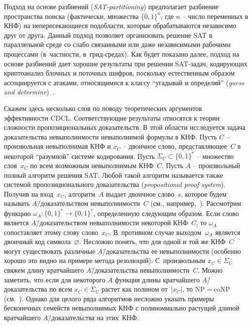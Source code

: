Подход на основе разбиений (\textit{SAT-partitioning}) предполагает разбиение пространства поиска (фактически, множества $\{ 0,1 \}^{n}$, где $n$ \--- число переменных в КНФ) на непересекающиеся подобласти, которые обрабатываются независимо друг от друга.
Данный подход позволяет организовать решение SAT в параллельной среде со слабо связанными или даже независимыми рабочими процессами (в~частности, в~грид-средах).
Как будет показано далее, подход на основе разбиений дает хорошие результаты при решении SAT-задач, кодирующих криптоанализ блочных и поточных шифров, поскольку естественным образом ассоциируется с атаками, относящимися к классу \enquote{угадывай и определяй} (\textit{guess and determine})~\cite{bard2009}.

Скажем здесь несколько слов по поводу теоретических аргументов эффективности CDCL.
Соответствующие результаты относятся к теории сложности пропозициональных доказательств.
В этой области исследуется задача доказательства невыполнимости невыполнимой формулы в КНФ.
Пусть $C$ \--- произвольная невыполнимая КНФ и $x_{C}$ \--- двоичное слово, представляющее~$C$ в некоторой \enquote{разумной} системе кодирования.
Пусть $\Sigma_{U} \subset \{ 0,1 \}^{*}$ \--- множество слов~$x_{C}$ по всем возможным невыполнимым КНФ~$C$.
Пусть $A$ \--- произвольный полный алгоритм решения SAT.
Любой такой алгоритм называется также системой пропозиционального доказательства (\textit{propositional proof system}).
Получив на вход~$x_{C}$, алгоритм~$A$ выдает двоичное слово~$s$, которое будем называть $A$\=/доказательством невыполнимости~$C$ (см., например,~\cite{razborov2002}).
Рассмотрим функцию $\omega_{A} \colon \{ 0,1 \}^{*} \to \{ 0,1 \}^{*}$, определенную следующим образом.
Если слово является $A$\=/доказательством невыполнимости некоторой КНФ~$C$, то $\omega_{A}$ сопоставляет этому слову слово~$x_{C}$.
В~противном случае выходом~$\omega_{A}$ является двоичный код символа~$\varnothing$.
Несложно понять, что для одной и той же КНФ~$C$ могут существовать различные $A$\=/доказательства ее невыполнимости (особенно хорошо это видно на примере метода резолюций).
С~произвольным $x_{C} \in \Sigma_{U}$ свяжем длину кратчайшего $A$\=/доказательства невыполнимости~$C$.
Можно заметить, что если для некоторого $A$ функция длины кратчайшего $A$\=/доказательства по всем $x_{C} \in \Sigma_{U}$ растет как полином от~$|x_{C}|$, то $\mathrm{NP} = \mathrm{coNP}$ (см.~\cite{cook1979}).
Однако для целого ряда алгоритмов несложно указать примеры бесконечных семейств невыполнимых КНФ с полиномиально растущей длиной кратчайшего $A$\=/доказательства на этих~КНФ.

